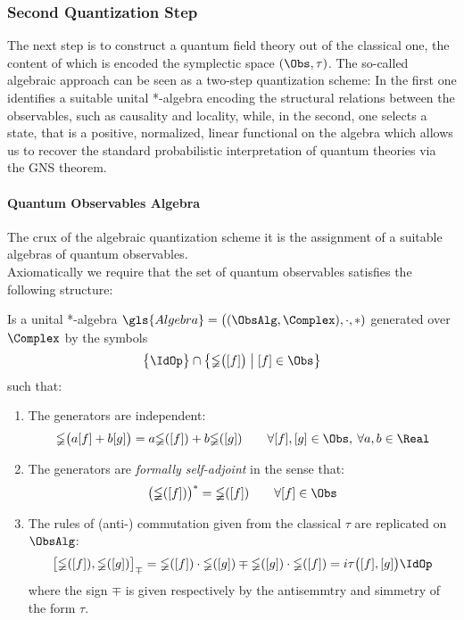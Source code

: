 \documentclass[Main]{subfiles}
\begin{document}
	\subsubsection{Second Quantization Step}%
		The next step is to construct a quantum field theory out of the classical one, the content of which is encoded the symplectic space $(\Obs, \tau)$. 
		The so-called algebraic approach can be seen as a two-step quantization scheme: In the first one identifies a suitable unital  *-algebra encoding the structural relations between the observables, such as causality and locality, while, in the second, one selects a state, that is a positive, normalized, linear functional on the algebra which allows us to recover the standard probabilistic interpretation of quantum theories via the GNS theorem.
		

		\paragraph{Quantum Observables Algebra}   		
		The crux of the algebraic quantization scheme it is the assignment of a suitable algebras of quantum observables.\\
		Axiomatically we require that the set of quantum observables satisfies the following structure:
		\begin{definition}
			Is a unital *-algebra $\gls{Algebra}= \big( (\ObsAlg, \Complex),\cdot,*)$ generated over $\Complex$ by the symbols 
			\begin{displaymath}
				\big\{\IdOp\big\}\cap \big\{\mathbb{\Phi}\big( [f]\big) \; \big\vert \;  [f] \in \Obs \big\}
			\end{displaymath}
			such that:
			\begin{enumerate}
				\item The generators are independent:
					\begin{displaymath}
						\mathbb{\Phi} \big(a [f] + b [g] \big) = 
						a \mathbb{\Phi} ([f]) + b \mathbb{\Phi} ([g]) \qquad \forall [f],[g] \in \Obs,\: \forall a,b \in \Real
					\end{displaymath}
				\item The generators are \emph{formally self-adjoint} in the sense that:
					\begin{displaymath}
						\big( \mathbb{\Phi}([f]) \big)^* = \mathbb{\Phi}([f]) \qquad \forall [f] \in \Obs
					\end{displaymath}
				\item The rules of (anti-) commutation given from the classical $\tau$ are replicated on $\ObsAlg$:
					\begin{displaymath}
						\big[ \mathbb{\Phi}([f]), \mathbb{\Phi}([g]) \big]_\mp = \mathbb{\Phi}([f]) \cdot \mathbb{\Phi}([g]) \mp \mathbb{\Phi}([g]) \cdot \mathbb{\Phi}([f]) = i \tau\big( [f], [g] \big) \IdOp
					\end{displaymath}
					where the sign $\mp$ is given respectively by the antisemmtry and simmetry of the form $\tau$.
			\end{enumerate}

		\end{definition}
\end{document}
